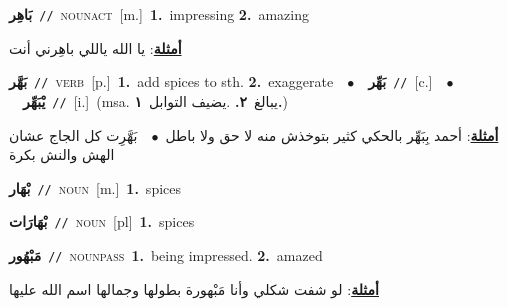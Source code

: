\documentclass[10pt,a4paper,twoside]{article} %
\begin{document}
\begin{multicols}{2}
{\setlength\topsep{0pt}\textbf{\foreignlanguage{arabic}{بَاهِر}}\ {\color{gray}\texttt{//}\color{black}}\ \textsc{noun\textunderscore act}\ [m.]\ \textbf{1.}~impressing  \textbf{2.}~amazing\  \begin{flushright}\color{gray}\foreignlanguage{arabic}{\textbf{\underline{\foreignlanguage{arabic}{أمثلة}}}: يا الله ياللي باهِرني أنت}\end{flushright}\color{black}} \vspace{2mm}

{\setlength\topsep{0pt}\textbf{\foreignlanguage{arabic}{بَهَّر}}\ {\color{gray}\texttt{//}\color{black}}\ \textsc{verb}\ [p.]\ \textbf{1.}~add spices to sth.  \textbf{2.}~exaggerate\ \ $\bullet$\ \ \setlength\topsep{0pt}\textbf{\foreignlanguage{arabic}{بَهِّر}}\ {\color{gray}\texttt{//}\color{black}}\ [c.]\ \ $\bullet$\ \ \setlength\topsep{0pt}\textbf{\foreignlanguage{arabic}{يْبَهِّر}}\ {\color{gray}\texttt{//}\color{black}}\ [i.]\ \color{gray}(msa. \foreignlanguage{arabic}{يبالغ}~\foreignlanguage{arabic}{\textbf{٢.}}  .\foreignlanguage{arabic}{يضيف التوابل}~\foreignlanguage{arabic}{\textbf{١.}})\color{black}\  \begin{flushright}\color{gray}\foreignlanguage{arabic}{\textbf{\underline{\foreignlanguage{arabic}{أمثلة}}}: أحمد بِبَهِّر بالحكي كثير بتوخذش منه لا حق ولا باطل\ $\bullet$\ \  بَهَّرِت كل الجاج عشان الهش والنش بكرة}\end{flushright}\color{black}} \vspace{2mm}

{\setlength\topsep{0pt}\textbf{\foreignlanguage{arabic}{بْهَار}}\ {\color{gray}\texttt{//}\color{black}}\ \textsc{noun}\ [m.]\ \textbf{1.}~spices\ } \vspace{2mm}

{\setlength\topsep{0pt}\textbf{\foreignlanguage{arabic}{بْهَارَات}}\ {\color{gray}\texttt{//}\color{black}}\ \textsc{noun}\ [pl]\ \textbf{1.}~spices\ } \vspace{2mm}

{\setlength\topsep{0pt}\textbf{\foreignlanguage{arabic}{مَبْهُور}}\ {\color{gray}\texttt{//}\color{black}}\ \textsc{noun\textunderscore pass}\ \textbf{1.}~being impressed.  \textbf{2.}~amazed\  \begin{flushright}\color{gray}\foreignlanguage{arabic}{\textbf{\underline{\foreignlanguage{arabic}{أمثلة}}}: لو شفت شكلي وأنا مَبْهورة بطولها وجمالها اسم الله عليها}\end{flushright}\color{black}} \vspace{2mm}


\end{multicols}
\end{document}
